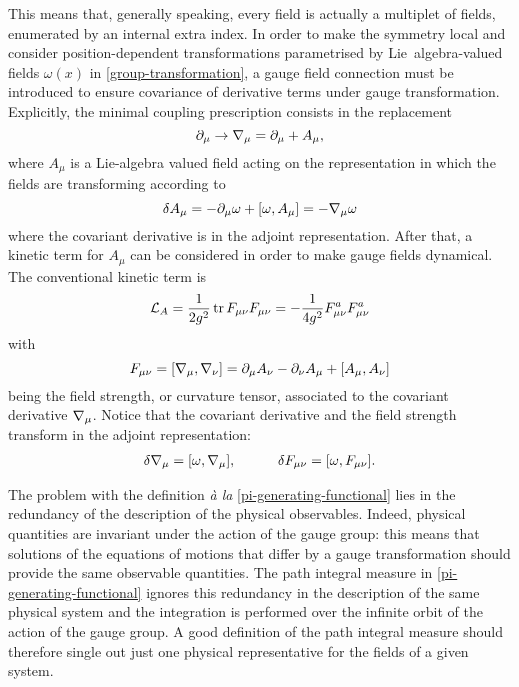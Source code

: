 This means that, generally speaking, every field is actually a multiplet of fields, enumerated by an internal extra index. In order to make the symmetry local and consider position-dependent transformations parametrised by  Lie~algebra-valued fields $\omega(x)$ in \eqref{group-transformation}, a gauge field connection must be introduced  to ensure covariance of derivative terms under gauge transformation. Explicitly, the minimal coupling prescription consists in the replacement 
\begin{equation}
\partial_\mu \rightarrow { \mathcal{\nabla} }_\mu = \partial_\mu + A_\mu,
\end{equation}
where $A_\mu$ is a Lie-algebra valued field acting on the representation in which the fields are transforming according to
\begin{equation}\label{gauge-transf-A}
\delta A_\mu = -\partial_\mu \omega + [\omega,A_\mu] = -{ \mathcal{\nabla} }_\mu \omega
\end{equation}
where the covariant derivative is in the adjoint representation.
After that, a kinetic term for $A_\mu$ can be considered in order to make gauge fields dynamical. The conventional kinetic term is
\begin{equation}\label{kinetic-term-F}
{ \mathcal{L} }_A = \frac{1}{2g^2} \operatorname{tr} F_{\mu\nu} F_{\mu\nu} 
= -  \frac{1}{4 g^2} F^a_{\mu\nu} F^a_{\mu\nu}
\end{equation}
with
\begin{equation}
F_{\mu\nu} = [{ \mathcal{\nabla} }_\mu,{ \mathcal{\nabla} }_\nu] = \partial_\mu A_\nu - \partial_\nu A_\mu + [A_\mu, A_\nu]
\end{equation}
being the \ym{} field strength, or curvature tensor, associated to the covariant derivative ${ \mathcal{\nabla} }_\mu$. Notice that the covariant derivative and the field strength  transform in the adjoint representation:
\begin{align}
\delta { \mathcal{\nabla} }_\mu = [\omega, { \mathcal{\nabla} }_\mu],
\hspace{3em}
\delta F_{\mu\nu} = [\omega, F_{\mu\nu} ].
\end{align}


The problem with the definition \emph{\`a la} \eqref{pi-generating-functional} lies in the redundancy of the description of the physical observables. Indeed, physical quantities are invariant under the action of the gauge group: this means that solutions of the equations of motions that differ by a gauge transformation should provide the same observable quantities. The path integral measure in \eqref{pi-generating-functional} ignores this redundancy in the description of the same physical system and the integration is performed over the infinite orbit of the action of the gauge group. A good definition of the path integral measure should therefore single out just one physical representative for the  fields of a given system.

